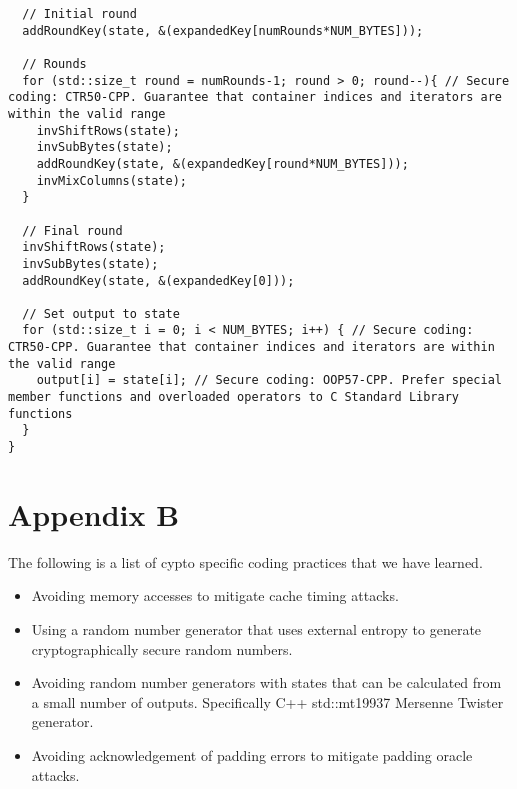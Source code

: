 \documentclass[a4paper,12pt]{article}
\begin{document}
{\begin{lstlisting}
  // Initial round
  addRoundKey(state, &(expandedKey[numRounds*NUM_BYTES]));

  // Rounds
  for (std::size_t round = numRounds-1; round > 0; round--){ // Secure coding: CTR50-CPP. Guarantee that container indices and iterators are within the valid range
    invShiftRows(state);
    invSubBytes(state);
    addRoundKey(state, &(expandedKey[round*NUM_BYTES]));
    invMixColumns(state);
  }

  // Final round
  invShiftRows(state);
  invSubBytes(state);
  addRoundKey(state, &(expandedKey[0]));

  // Set output to state
  for (std::size_t i = 0; i < NUM_BYTES; i++) { // Secure coding: CTR50-CPP. Guarantee that container indices and iterators are within the valid range
    output[i] = state[i]; // Secure coding: OOP57-CPP. Prefer special member functions and overloaded operators to C Standard Library functions
  }
}

\end{lstlisting}
}

\section{Appendix B}
The following is a list of cypto specific coding practices that we have learned.

\begin{itemize}
    \item Avoiding memory accesses to mitigate cache timing attacks.
    \item Using a random number generator that uses external entropy to generate cryptographically secure random numbers.
    \item Avoiding random number generators with states that can be calculated from a small number of outputs. Specifically C++ {\selectfont std::mt19937} Mersenne Twister generator.
    \item Avoiding acknowledgement of padding errors to mitigate padding oracle attacks.
    
\end{itemize}

\end{document}
